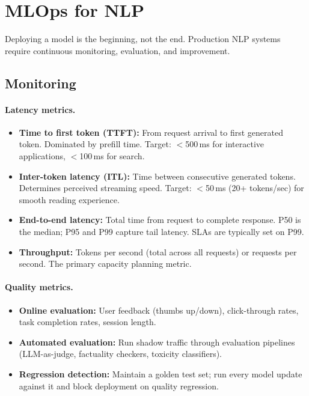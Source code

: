 \section{MLOps for NLP}
\label{sec:mlops_nlp}

Deploying a model is the beginning, not the end.  Production NLP systems require
continuous monitoring, evaluation, and improvement.

\subsection{Monitoring}

\paragraph{Latency metrics.}
\begin{itemize}
    \item \textbf{Time to first token (TTFT):}  From request arrival to first generated
          token.  Dominated by prefill time.  Target: $<$500\,ms for interactive
          applications, $<$100\,ms for search.
    \item \textbf{Inter-token latency (ITL):}  Time between consecutive generated tokens.
          Determines perceived streaming speed.  Target: $<$50\,ms (20+ tokens/sec)
          for smooth reading experience.
    \item \textbf{End-to-end latency:}  Total time from request to complete response.
          P50 is the median; P95 and P99 capture tail latency.  SLAs are typically
          set on P99.
    \item \textbf{Throughput:}  Tokens per second (total across all requests) or
          requests per second.  The primary capacity planning metric.
\end{itemize}

\paragraph{Quality metrics.}
\begin{itemize}
    \item \textbf{Online evaluation:} User feedback (thumbs up/down), click-through
          rates, task completion rates, session length.
    \item \textbf{Automated evaluation:} Run shadow traffic through evaluation pipelines
          (LLM-as-judge, factuality checkers, toxicity classifiers).
    \item \textbf{Regression detection:} Maintain a golden test set; run every model
          update against it and block deployment on quality regression.
\end{itemize}

